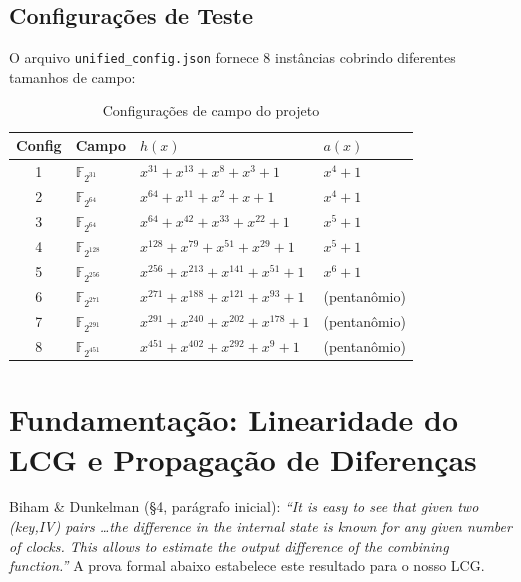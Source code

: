 \documentclass[12pt,a4paper]{article}
\theoremstyle{definition}
\theoremstyle{remark}
\newcommand{\GF}[1]{\mathbb{F}_{2^{#1}}}
\begin{document}
\subsection{Configurações de Teste}

O arquivo \texttt{unified\_config.json} fornece 8 instâncias cobrindo
diferentes tamanhos de campo:

\begin{table}[H]
  \centering
  \caption{Configurações de campo do projeto}
  \begin{tabular}{clll}
    \toprule
    \textbf{Config} & \textbf{Campo} & \textbf{$h(x)$} & \textbf{$a(x)$} \\
    \midrule
    1 & $\GF{31}$  & $x^{31}+x^{13}+x^8+x^3+1$ & $x^4+1$ \\
    2 & $\GF{64}$  & $x^{64}+x^{11}+x^2+x+1$   & $x^4+1$ \\
    3 & $\GF{64}$  & $x^{64}+x^{42}+x^{33}+x^{22}+1$ & $x^5+1$ \\
    4 & $\GF{128}$ & $x^{128}+x^{79}+x^{51}+x^{29}+1$ & $x^5+1$ \\
    5 & $\GF{256}$ & $x^{256}+x^{213}+x^{141}+x^{51}+1$ & $x^6+1$ \\
    6 & $\GF{271}$ & $x^{271}+x^{188}+x^{121}+x^{93}+1$ & (pentanômio) \\
    7 & $\GF{291}$ & $x^{291}+x^{240}+x^{202}+x^{178}+1$ & (pentanômio) \\
    8 & $\GF{451}$ & $x^{451}+x^{402}+x^{292}+x^9+1$    & (pentanômio) \\
    \bottomrule
  \end{tabular}
\end{table}

\section{Fundamentação: Linearidade do LCG e Propagação de Diferenças}

\begin{paperref}
  Biham \& Dunkelman (\S4, parágrafo inicial): \textit{``It is easy to see
  that given two (key,IV) pairs \ldots the difference in the internal state
  is known for any given number of clocks. This allows to estimate the output
  difference of the combining function.''}  A prova formal abaixo estabelece
  este resultado para o nosso LCG.
\end{paperref}
\end{document}
